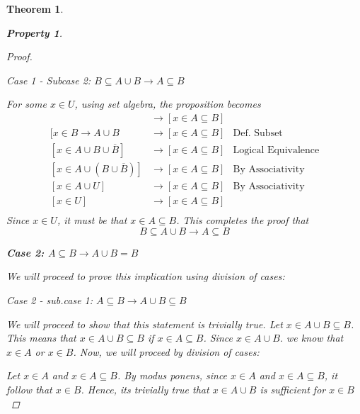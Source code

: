 \documentclass{book}
\newtheorem{theorem}{Theorem}[section]
\newtheorem{property}{Property}[theorem]
\theoremstyle{definition}
\theoremstyle{remark}
\begin{document}
\begin{theorem}
\begin{property}
\begin{proof}
                \begin{flushleft} \textit{Case 1 - Subcase 2: $B \subseteq A \cup B \to A \subseteq B$} \end{flushleft} 
                    For some $x \in U$, using set algebra, the proposition becomes
                        \begin{align*}
                            [x \in B \subseteq A \cup B] & \to [x \in A \subseteq B] \\
                            [x \in B \to A \cup B & \to [x \in A \subseteq B]  & \text{Def. Subset} \\
                            [x \in A \cup B \cup \overline{B}] & \to [x \in A \subseteq B]  & \text{Logical Equivalence} \\
                            [x \in A \cup (B \cup \overline{B})] & \to [x \in A \subseteq B]  & \text{By Associativity} \\
                            [x \in A \cup U] & \to [x \in A \subseteq B]  & \text{By Associativity} \\   
                            [x \in U] & \to [x \in A \subseteq B]  \\ 
                        \end{align*}
                    Since $x \in U$, it must be that $x \in A \subseteq B$. This completes the proof that $$ B \subseteq A \cup B \to A \subseteq B $$
                    
                    
            \begin{flushleft} \textbf{Case 2: $A \subseteq B \to A \cup B = B$} \end{flushleft}
                We will proceed to prove this implication using division of cases:   
                \begin{flushleft} \textit{Case 2 - sub.case 1: $A \subseteq B \to A \cup B \subseteq B$} \end{flushleft}
                    We will proceed to show that this statement is trivially true. Let $x \in A \cup B \subseteq B$. This means that $x \in A \cup B \subseteq B$ if $x \in A \subseteq B$. Since $x \in A \cup B$. we know that $x \in A$ or $x \in B$. Now, we will proceed by division of cases:
                        \begin{flushleft}  \end{flushleft}
                            Let $x \in A$ and $x \in A \subseteq B$. By \textit{modus ponens}, since $x \in A$ and $x \in A \subseteq B$, it follow that $x \in B$. Hence, its trivially true that $x \in A \cup B$ is sufficient for $x \in B$
                    

\end{proof}
\end{property}
\end{theorem}
\end{document}

